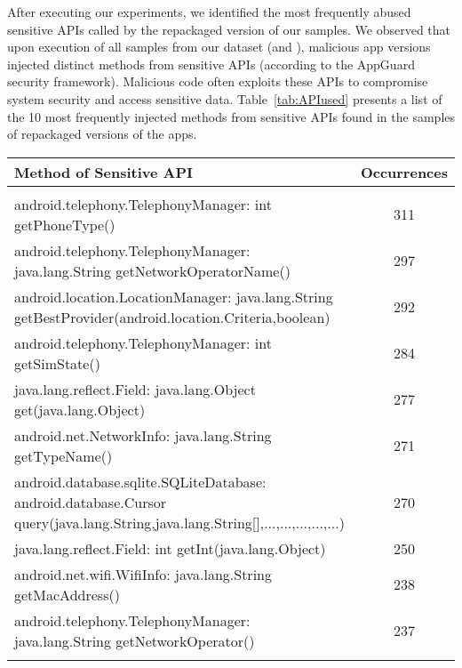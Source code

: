 After executing our experiments, we identified the  most frequently abused sensitive APIs called by the repackaged version of our samples.
We observed that upon execution of all samples from our dataset (\sds and \cds), malicious app versions injected  distinct methods from sensitive APIs (according to the
AppGuard~\cite{DBLP:conf/esorics/BackesGHMS13} security framework).
Malicious code often exploits these APIs to compromise system security and access sensitive data. Table~\ref{tab:APIused}
presents a list of the 10 most frequently injected methods from sensitive APIs found in the
\cds samples of repackaged versions of the apps.

\begin{table*}[ht]
  \caption{Sensitive APIs that frequently appear in the repackaged versions of the apps. The
    \emph{Occurrences} column gives the number of distinct repackaged apps that introduce a call
  to a sensitive method.}
\centering
  \begin{tabular}{lc}

    \hline
    Method of Sensitive API & Occurrences \\
    \hline \\
    android.telephony.TelephonyManager: int getPhoneType() &  311\\
    android.telephony.TelephonyManager: java.lang.String getNetworkOperatorName() &  297 \\
    android.location.LocationManager: java.lang.String getBestProvider(android.location.Criteria,boolean) &  292 \\
    android.telephony.TelephonyManager: int getSimState() &	284\\
 java.lang.reflect.Field: java.lang.Object get(java.lang.Object)&	277\\
    android.net.NetworkInfo: java.lang.String getTypeName() &  271\\
    android.database.sqlite.SQLiteDatabase: android.database.Cursor query(java.lang.String,java.lang.String[],...,...,...,...,...) &  270 \\
       java.lang.reflect.Field: int getInt(java.lang.Object) &  250\\
        android.net.wifi.WifiInfo: java.lang.String getMacAddress()	& 238\\
    
    android.telephony.TelephonyManager: java.lang.String getNetworkOperator() &  237\\



    
\\\hline
\end{tabular}
\label{tab:APIused}
\end{table*}


